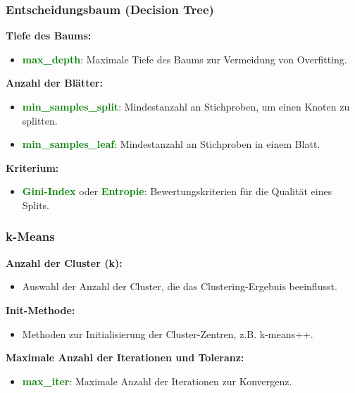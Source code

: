 \documentclass[10pt]{beamer}
\newcommand{\htgreen}[1] {{\bf \textcolor{Green}{#1}}}
\begin{document}
\begin{frame}
  \frametitle{Entscheidungsbaum (Decision Tree)}
  {\bf Tiefe des Baums: }
    \begin{itemize}
      \item {\bf \textcolor{Green}{max\_depth}}:
          Maximale Tiefe des Baums zur Vermeidung von Overfitting.
    \end{itemize}

    \vspace{0.5cm}

  {\bf Anzahl der Blätter: }
    \begin{itemize}
      \item {\bf \textcolor{Green}{min\_samples\_split}}:
          Mindestanzahl an Stichproben, um einen Knoten zu splitten.
        \item \htgreen{min\_samples\_leaf}: Mindestanzahl an 
          Stichproben in einem Blatt.
    \end{itemize}

    \vspace{0.5cm}

  {\bf Kriterium: }
    \begin{itemize}
      \item \htgreen{Gini-Index} oder \htgreen{Entropie}: 
        Bewertungskriterien für die Qualität eines Splits.
    \end{itemize}
\end{frame}

\begin{frame}
  \frametitle{k-Means}
  {\bf Anzahl der Cluster (k): }
    \begin{itemize}
      \item  Auswahl der Anzahl der Cluster,
        die das Clustering-Ergebnis beeinflusst.
    \end{itemize}

    \vspace{0.5cm}

  {\bf Init-Methode: }
    \begin{itemize}
      \item Methoden zur Initialisierung der Cluster-Zentren, z.B. k-means++.
    \end{itemize}

    \vspace{0.5cm}

  {\bf Maximale Anzahl der Iterationen und Toleranz: }
    \begin{itemize}
      \item \htgreen{max\_iter}: Maximale Anzahl der Iterationen
        zur Konvergenz.
    \end{itemize}
\end{frame}
\end{document}
